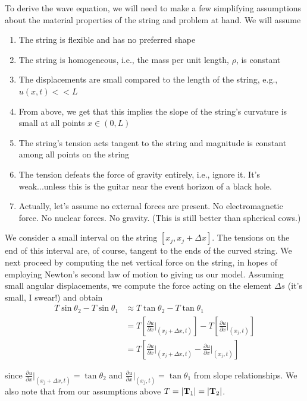 To derive the wave equation, we will need to make a few simplifying assumptions about the material properties of the string and problem at hand. We will assume
\begin{enumerate}
\item The string is flexible and has no preferred shape
\item The string is homogeneous, i.e., the mass per unit length, $\rho$, is constant
\item The displacements are small compared to the length of the string, e.g.,  $u(x,t)<<L$
\item From above, we get that this implies the slope of the string's curvature is small at all points $x\in(0,L)$
\item The string's tension acts tangent to the string and magnitude is constant among all points on the string
\item The tension defeats the force of gravity entirely, i.e., ignore it. It's weak...unless this is the guitar near the event horizon of a black hole.
\item Actually, let's assume no external forces are present. No electromagnetic force. No nuclear forces. No gravity. (This is still better than spherical cows.)
\end{enumerate}

We consider a small interval on the string $[x_j,x_j+\Delta x]$. The tensions on the end of this interval are, of course, tangent to the ends of the curved string. We next proceed by computing the net vertical force on the string, in hopes of employing Newton's second law of motion to giving us our model. Assuming small angular displacements, we compute the force acting on the element $\Delta s$ (it's small, I swear!) and obtain
\begin{align*}
T \sin\theta_2 - T\sin\theta_1 &\approx T\tan\theta_2 - T\tan\theta_1 \\
&= T\left[ \frac{\partial u}{\partial x}\Big|_{(x_j+\Delta x, t)}  \right] - T\left[ \frac{\partial u}{\partial x}\Big|_{(x_j, t)}  \right]\\
&= T\left[ \frac{\partial u}{\partial x}\Big|_{(x_j+\Delta x, t)}  -  \frac{\partial u}{\partial x}\Big|_{(x_j, t)}  \right]
\end{align*}

since $ \frac{\partial u}{\partial x}\Big|_{(x_j+\Delta x, t)} = \tan\theta_2$ and $\frac{\partial u}{\partial x}\Big|_{(x_j, t)}  = \tan\theta_1$ from slope relationships. We also note that from our assumptions above $T=| {\bf{T}}_1 |= |{\bf{T}}_2|$.\\

